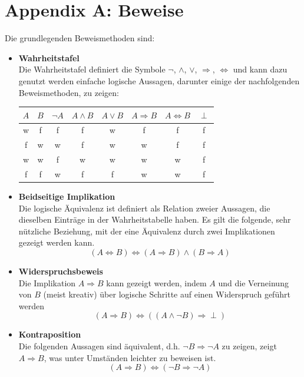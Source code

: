 \documentclass{article}
\begin{document}
\newpage


\section{Appendix A: Beweise}
Die grundlegenden Beweismethoden sind:
\begin{itemize}	
	\item \textbf{Wahrheitstafel}\\
	Die Wahrheitstafel definiert die Symbole $\neg$, $\wedge$, $\vee$, $\Rightarrow$, $\Leftrightarrow$ und kann dazu genutzt werden einfache logische Aussagen, darunter einige der nachfolgenden Beweismethoden, zu zeigen:
		\begin{table}[h]
			\centering
			\begin{tabular}{c|c||c|c|c|c|c|c}
				\hline\hline
					$A$ & $B$ & $\neg A$ & $A \wedge B$ & $A \vee B$ & $A \Rightarrow B$ & $A \Leftrightarrow B$ & $\perp$ \\
				\hline
					w & f & f & f & w & f & f & f \\
					f & w & w & f & w & w & f & f \\
					w & w & f & w & w & w & w & f \\
					f & f & w & f & f & w & w & f \\
				\hline\hline
			\end{tabular}
		\end{table}


	\item \textbf{Beidseitige Implikation}\\
	Die logische Äquivalenz ist definiert als Relation zweier Aussagen, die dieselben Einträge in der Wahrheitstabelle haben. Es gilt die folgende, sehr nützliche Beziehung, mit der eine Äquivalenz durch zwei Implikationen gezeigt werden kann.
		\begin{equation}
			(A\Leftrightarrow B) \Leftrightarrow (A\Rightarrow B) \wedge (B\Rightarrow A)
		\end{equation}

	\item \textbf{Widerspruchsbeweis}\\
	Die Implikation $A\Rightarrow B$ kann gezeigt werden, indem $A$ und die Verneinung von $B$ (meist kreativ) über logische Schritte auf einen Widerspruch geführt werden
		\begin{equation}
			(A\Rightarrow B) \Leftrightarrow ((A\wedge \neg B) \Rightarrow \perp)
		\end{equation}

	\item \textbf{Kontraposition}\\
	Die folgenden Aussagen sind äquivalent, d.h. $\neg B \Rightarrow \neg A$ zu zeigen, zeigt $A\Rightarrow B$, was unter Umständen leichter zu beweisen ist.
		\begin{equation}
			(A\Rightarrow B) \Leftrightarrow (\neg B \Rightarrow \neg A)
		\end{equation}


\end{itemize}
\end{document}
